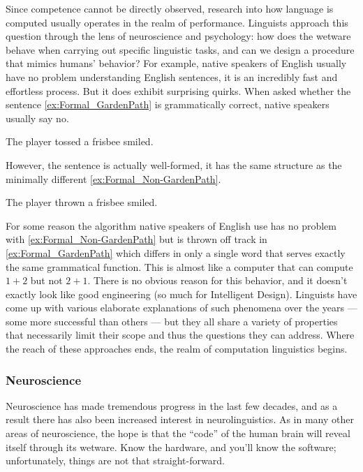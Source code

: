 Since competence cannot be directly observed, research into how language is computed usually operates in the realm of performance.
Linguists approach this question through the lens of neuroscience and psychology: how does the wetware behave when carrying out specific linguistic tasks, and can we design a procedure that mimics humans' behavior?
For example, native speakers of English usually have no problem understanding English sentences, it is an incredibly fast and effortless process.
But it does exhibit surprising quirks.
When asked whether the sentence \eqref{ex:Formal_GardenPath} is grammatically correct, native speakers usually say no.
%
\begin{exe}
        \ex The player tossed a frisbee smiled.\label{ex:Formal_GardenPath}
\end{exe}
%
However, the sentence is actually well-formed, it has the same structure as the minimally different \eqref{ex:Formal_Non-GardenPath}. 
%
\begin{exe}
    \ex The player thrown a frisbee smiled.\label{ex:Formal_Non-GardenPath}
\end{exe}
%
For some reason the algorithm native speakers of English use has no problem with \eqref{ex:Formal_Non-GardenPath} but is thrown off track in \eqref{ex:Formal_GardenPath} which differs in only a single word that serves exactly the same grammatical function.
This is almost like a computer that can compute $1 + 2$ but not $2 + 1$.
There is no obvious reason for this behavior, and it doesn't exactly look like good engineering (so much for Intelligent Design).
Linguists have come up with various elaborate explanations of such phenomena over the years --- some more successful than others ---
but they all share a variety of properties that necessarily limit their scope and thus the questions they can address.
Where the reach of these approaches ends, the realm of computation linguistics begins.

\subsubsection{Neuroscience}
\label{sub:formal_arguments_science_neuro}

Neuroscience has made tremendous progress in the last few decades, and as a result there has also been increased interest in neurolinguistics.
As in many other areas of neuroscience, the hope is that the ``code'' of the human brain will reveal itself through its wetware.
Know the hardware, and you'll know the software; unfortunately, things are not that straight-forward.


